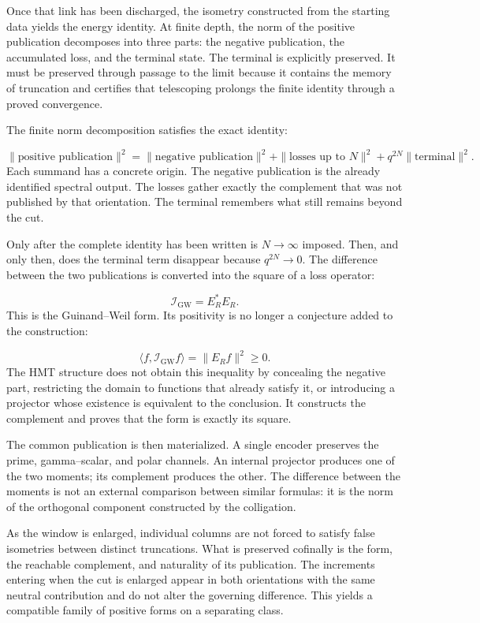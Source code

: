 Once that link has been discharged, the isometry constructed from the starting data yields the energy identity. At finite depth, the norm of the positive publication decomposes into three parts: the negative publication, the accumulated loss, and the terminal state. The terminal is explicitly preserved. It must be preserved through passage to the limit because it contains the memory of truncation and certifies that telescoping prolongs the finite identity through a proved convergence.\par
The finite norm decomposition satisfies the exact identity:\par
\[
\|\text{positive publication}\|^2
=
\|\text{negative publication}\|^2
+
\|\text{losses up to }N\|^2
+
q^{2N}\|\text{terminal}\|^2.
\]
Each summand has a concrete origin. The negative publication is the already identified spectral output. The losses gather exactly the complement that was not published by that orientation. The terminal remembers what still remains beyond the cut.\par
Only after the complete identity has been written is \(N\to\infty\) imposed. Then, and only then, does the terminal term disappear because \(q^{2N}\to0\). The difference between the two publications is converted into the square of a loss operator:\par
\[
\mathcal I_{\mathrm{GW}}
=
E_R^{*}E_R.
\]
This is the Guinand--Weil form. Its positivity is no longer a conjecture added to the construction:\par
\[
\langle f,\mathcal I_{\mathrm{GW}}f\rangle
=
\|E_Rf\|^2
\ge0.
\]
The HMT structure does not obtain this inequality by concealing the negative part, restricting the domain to functions that already satisfy it, or introducing a projector whose existence is equivalent to the conclusion. It constructs the complement and proves that the form is exactly its square.\par
The common publication is then materialized. A single encoder preserves the prime, gamma–scalar, and polar channels. An internal projector produces one of the two moments; its complement produces the other. The difference between the moments is not an external comparison between similar formulas: it is the norm of the orthogonal component constructed by the colligation.\par
As the window is enlarged, individual columns are not forced to satisfy false isometries between distinct truncations. What is preserved cofinally is the form, the reachable complement, and naturality of its publication. The increments entering when the cut is enlarged appear in both orientations with the same neutral contribution and do not alter the governing difference. This yields a compatible family of positive forms on a separating class.\par
